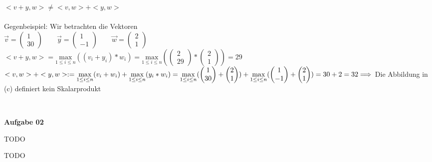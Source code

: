 \documentclass[a4paper,10pt]{article}
\begin{document}
\begin{compactenum} [(a)]
		\item $ <v+y,w> \neq <v,w> + <y,w> $\\\\
		Gegenbeispiel: Wir betrachten die Vektoren\\
		$ \vec{v} = \begin{pmatrix}
		1 \\ 30
		\end{pmatrix} \qquad
		\vec{y} = \begin{pmatrix}
		1 \\ -1
		\end{pmatrix} \qquad
		\vec{w} = \begin{pmatrix}
		2 \\ 1
		\end{pmatrix}$\\
		$ <v+y,w> = \underset{1 \leq i \leq n}{\text{max}} (
			(v_i+y_i) * w_i) = \underset{1 \leq i \leq n}{\text{max}} (\begin{pmatrix} 2 \\ 29 \end{pmatrix} * 
			\begin{pmatrix} 2 \\ 1 \end{pmatrix}) = 29 $ \\
		$ <v,w> + <y,w> := \underset{1 \leq i \leq n}{\text{max}} (v_i + w_i) + \underset{1 \leq i \leq n}{\text{max}} (y_i * w_i) = 
		\underset{1 \leq i \leq n}{\text{max}} (
		\begin{pmatrix}
		1 \\ 30
		\end{pmatrix} + 
		\begin{pmatrix}
		2 \\ 1
		\end{pmatrix}) + \underset{1 \leq i \leq n}{\text{max}} (
		\begin{pmatrix}
		1 \\ -1
		\end{pmatrix} + 
		\begin{pmatrix}
		2 \\ 1
		\end{pmatrix} )\\
		= 30 + 2 = 32 \\
		\Longrightarrow $ Die Abbildung in (c) definiert kein Skalarprodukt
		
	\end{compactenum} \
	
	\textbf{Aufgabe 02}\\
	\begin{compactenum} [(a)]
		\item TODO
		\item TODO
	\end{compactenum}
	
	
\end{document}
